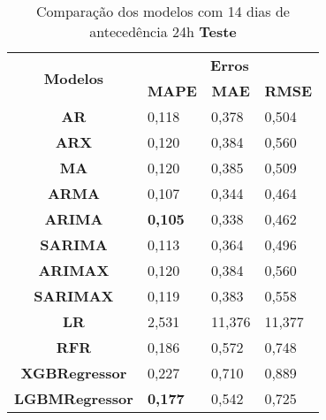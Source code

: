 \begin{table}[H]
	\centering
	\caption{Comparação dos modelos com 14 dias de antecedência 24h \textbf{Teste} }\label{tb:30-24tst}
	\begin{tabular}{@{}clll@{}}
		\toprule
		\multirow{2}{*}{\textbf{Modelos}} & \multicolumn{3}{c}{\textbf{Erros}}                                                                       \\ \cmidrule(l){2-4} 
		& \multicolumn{1}{c}{\textbf{MAPE}} & \multicolumn{1}{c}{\textbf{MAE}} & \multicolumn{1}{c}{\textbf{RMSE}} \\ \hline
\textbf{AR}                       & 0,118                             & 0,378                            & 0,504                             \\
\textbf{ARX}                      & 0,120                             & 0,384                            & 0,560                             \\
\textbf{MA}                       & 0,120                             & 0,385                            & 0,509                             \\
\textbf{ARMA}                     & 0,107                             & 0,344                            & 0,464                             \\
\textbf{ARIMA}                    & \textbf{0,105}                             & 0,338                            & 0,462                             \\
\textbf{SARIMA}                   & 0,113                             & 0,364                            & 0,496                             \\
\textbf{ARIMAX}                   & 0,120                             & 0,384                            & 0,560                             \\
\textbf{SARIMAX}                  & 0,119                             & 0,383                            & 0,558                             \\
\textbf{LR}                       & 2,531                             & 11,376                           & 11,377                            \\
\textbf{RFR}                      & 0,186                             & 0,572                            & 0,748                             \\
\textbf{XGBRegressor}             & 0,227                             & 0,710                            & 0,889                             \\
\textbf{LGBMRegressor}            & \textbf{0,177}                             & 0,542                            & 0,725                             \\ \bottomrule
	\end{tabular}

\end{table}

